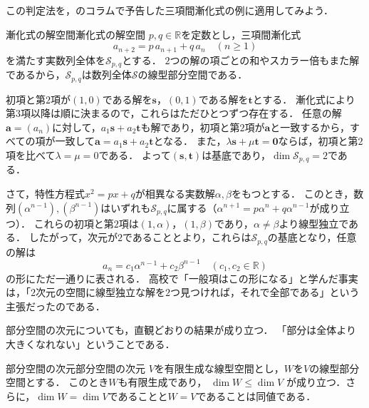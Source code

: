 この判定法を，のコラムで予告した三項間漸化式の例に適用してみよう．

\begin{example}{漸化式の解空間}{漸化式の解空間}
  $p,q\in\mathbb{R}$を定数とし，三項間漸化式
  \[
    a_{n+2}=p\,a_{n+1}+q\,a_n \quad (n\ge1)
  \]
  を満たす実数列全体を$\mathcal{S}_{p,q}$とする．
  $2$つの解の項ごとの和やスカラー倍もまた解であるから，$\mathcal{S}_{p,q}$は数列全体$\mathcal{S}$の線型部分空間である．

  初項と第$2$項が$(1,0)$である解を$\bm{s}$，$(0,1)$である解を$\bm{t}$とする．
  漸化式により第$3$項以降は順に決まるので，これらはただひとつずつ存在する．
  任意の解$\bm{a}=(a_n)$に対して，$a_1\bm{s}+a_2\bm{t}$も解であり，初項と第$2$項が$\bm{a}$と一致するから，すべての項が一致して$\bm{a}=a_1\bm{s}+a_2\bm{t}$となる．
  また，$\lambda\bm{s}+\mu\bm{t}=\bm{0}$ならば，初項と第$2$項を比べて$\lambda=\mu=0$である．
  よって$(\bm{s},\bm{t})$は基底であり，$\dim\mathcal{S}_{p,q}=2$である．

  さて，特性方程式$x^2=px+q$が相異なる実数解$\alpha,\beta$をもつとする．
  このとき，数列$(\alpha^{n-1}),(\beta^{n-1})$はいずれも$\mathcal{S}_{p,q}$に属する（$\alpha^{n+1}=p\alpha^n+q\alpha^{n-1}$が成り立つ）．
  これらの初項と第$2$項は$(1,\alpha)$，$(1,\beta)$であり，$\alpha\ne\beta$より線型独立である．
  したがって，次元が$2$であることとより，これらは$\mathcal{S}_{p,q}$の基底となり，任意の解は
  \[
    a_n=c_1\alpha^{n-1}+c_2\beta^{n-1} \quad (c_1,c_2\in\mathbb{R})
  \]
  の形にただ一通りに表される．
  高校で「一般項はこの形になる」と学んだ事実は，「$2$次元の空間に線型独立な解を$2$つ見つければ，それで全部である」という主張だったのである．
\end{example}

部分空間の次元についても，直観どおりの結果が成り立つ．
「部分は全体より大きくなれない」ということである．

\begin{prop}{部分空間の次元}{部分空間の次元}
  $V$を有限生成な線型空間とし，$W$を$V$の線型部分空間とする．
  このとき$W$も有限生成であり，
  $\dim W \le \dim V$
  が成り立つ．さらに，$\dim W = \dim V$であることと$W = V$であることは同値である．
\end{prop}

